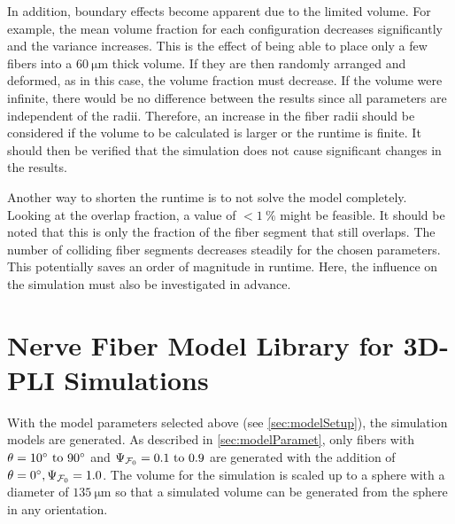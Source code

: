In addition, boundary effects become apparent due to the limited volume.
For example, the mean volume fraction for each configuration decreases significantly and the variance increases.
This is the effect of being able to place only a few fibers into a $\SI{60}{\micro\meter}$ thick volume.
If they are then randomly arranged and deformed, as in this case, the volume fraction must decrease.
If the volume were infinite, there would be no difference between the results since all parameters are independent of the radii.
Therefore, an increase in the fiber radii should be considered if the volume to be calculated is larger or the runtime is finite.
It should then be verified that the simulation does not cause significant changes in the results.
\par
%
Another way to shorten the runtime is to not solve the model completely.
Looking at the overlap fraction, a value of $<\SI{1}{\percent}$ might be feasible.
It should be noted that this is only the fraction of the fiber segment that still overlaps.
The number of colliding fiber segments decreases steadily for the chosen parameters.
This potentially saves an order of magnitude in runtime.
Here, the influence on the simulation must also be investigated in advance.
% 
%
%
\section{Nerve Fiber Model Library for \acs{3D-PLI} Simulations}
\label{sec:genNerveFiberLibrary}
%
With the model parameters selected above (see \cref{sec:modelSetup}), the simulation models are generated.
As described in \cref{sec:modelParamet}, only fibers with $\modelOmega = \SIrange{10}{90}{\degree}$ and $\modelPsi = \SIrange{0.1}{0.9}{}$ are generated with the addition of $\textnormal{$\theta$}=\SI{0}{\degree}, \textnormal{$\Psi_{\textnormal{$\mathcal{F}_0$}}$}=\SI{1.0}{}$.
The volume for the simulation is scaled up to a sphere with a diameter of $\SI{135}{\micro\meter}$ so that a simulated volume can be generated from the sphere in any orientation.
% 
%
%
